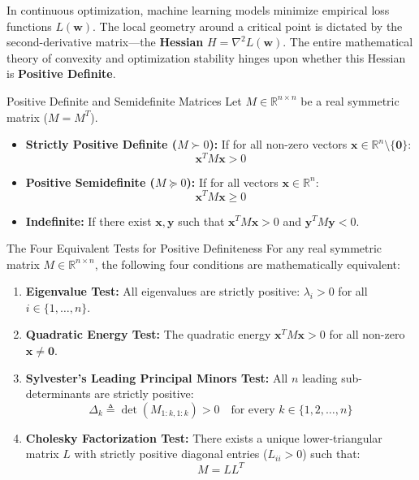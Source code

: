 In continuous optimization, machine learning models minimize empirical loss functions $L(\mathbf{w})$. The local geometry around a critical point is dictated by the second-derivative matrix—the \textbf{Hessian} $H = \nabla^2 L(\mathbf{w})$. The entire mathematical theory of convexity and optimization stability hinges upon whether this Hessian is \textbf{Positive Definite}.

\begin{definitionbox}{Positive Definite and Semidefinite Matrices}
Let $M \in \mathbb{R}^{n \times n}$ be a real symmetric matrix ($M = M^T$).
\begin{itemize}
    \item \textbf{Strictly Positive Definite ($M \succ 0$):} If for all non-zero vectors $\mathbf{x} \in \mathbb{R}^n \setminus \{\mathbf{0}\}$:
    \begin{equation}
    \mathbf{x}^T M \mathbf{x} > 0
    \end{equation}
    \item \textbf{Positive Semidefinite ($M \succeq 0$):} If for all vectors $\mathbf{x} \in \mathbb{R}^n$:
    \begin{equation}
    \mathbf{x}^T M \mathbf{x} \ge 0
    \end{equation}
    \item \textbf{Indefinite:} If there exist $\mathbf{x}, \mathbf{y}$ such that $\mathbf{x}^T M \mathbf{x} > 0$ and $\mathbf{y}^T M \mathbf{y} < 0$.
\end{itemize}
\end{definitionbox}

\begin{theorembox}{The Four Equivalent Tests for Positive Definiteness}
For any real symmetric matrix $M \in \mathbb{R}^{n \times n}$, the following four conditions are mathematically equivalent:
\begin{enumerate}
    \item \textbf{Eigenvalue Test:} All eigenvalues are strictly positive: $\lambda_i > 0$ for all $i \in \{1, \dots, n\}$.
    \item \textbf{Quadratic Energy Test:} The quadratic energy $\mathbf{x}^T M \mathbf{x} > 0$ for all non-zero $\mathbf{x} \ne \mathbf{0}$.
    \item \textbf{Sylvester's Leading Principal Minors Test:} All $n$ leading sub-determinants are strictly positive:
    \begin{equation}
    \Delta_k \triangleq \det(M_{1:k, 1:k}) > 0 \quad \text{for every } k \in \{1, 2, \dots, n\}
    \end{equation}
    \item \textbf{Cholesky Factorization Test:} There exists a unique lower-triangular matrix $L$ with strictly positive diagonal entries ($L_{ii} > 0$) such that:
    \begin{equation}
    M = L L^T
    \label{eq:cholesky_factorization}
    \end{equation}
\end{enumerate}
\end{theorembox}

